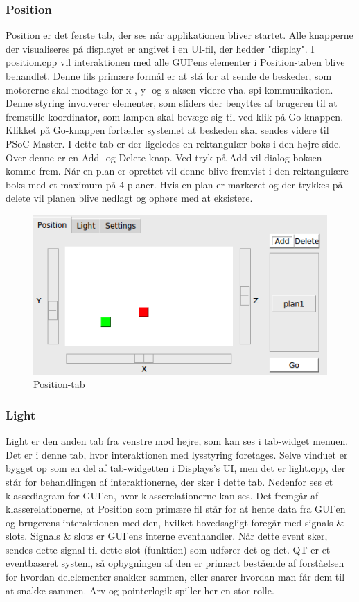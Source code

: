 \subsubsection{Position}
Position er det første tab, der ses når applikationen bliver startet. Alle knapperne der visualiseres på displayet er angivet i en UI-fil, der hedder "display". I position.cpp vil interaktionen med alle GUI’ens elementer i Position-taben blive behandlet. Denne fils primære formål er at stå for at sende de beskeder, som motorerne skal modtage for x-, y- og z-aksen videre vha. spi-kommunikation. Denne styring involverer elementer, som sliders der benyttes af brugeren til at fremstille koordinator, som lampen skal bevæge sig til ved klik på Go-knappen. Klikket på Go-knappen fortæller systemet at beskeden skal sendes videre til PSoC Master. I dette tab er der ligeledes en rektangulær boks i den højre side. Over denne er en Add- og Delete-knap. Ved tryk på Add vil dialog-boksen komme frem. Når en plan er oprettet vil denne blive fremvist i den rektangulære boks med et maximum på 4 planer. Hvis en plan er markeret og der trykkes på delete vil planen blive nedlagt og ophøre med at eksistere.

\begin{figure}[H]
\centering
\includegraphics[width=0.9\linewidth]{0_Filer/Figuer/Position.png}
\caption{Position-tab}
\label{fig:GUI Position}
\end{figure}

\subsubsection{Light}
Light er den anden tab fra venstre mod højre, som kan ses i tab-widget menuen. Det er i denne tab, hvor interaktionen med lysstyring foretages. Selve vinduet er bygget op som en del af tab-widgetten i Displays's UI, men det er light.cpp, der står for behandlingen af interaktionerne, der sker i dette tab. 
Nedenfor ses et klassediagram for GUI'en, hvor klasserelationerne kan ses. Det fremgår af klasserelationerne, at Position som primære fil står for at hente data fra GUI'en og brugerens interaktionen med den, hvilket hovedsagligt foregår med signals \& slots. Signals \& slots er GUI'ens interne eventhandler. Når dette event sker, sendes dette signal til dette slot (funktion) som udfører det og det. QT er et eventbaseret system, så opbygningen af den er primært bestående af forståelsen for hvordan delelementer snakker sammen, eller snarer hvordan man får dem til at snakke sammen. Arv og pointerlogik spiller her en stor rolle.

